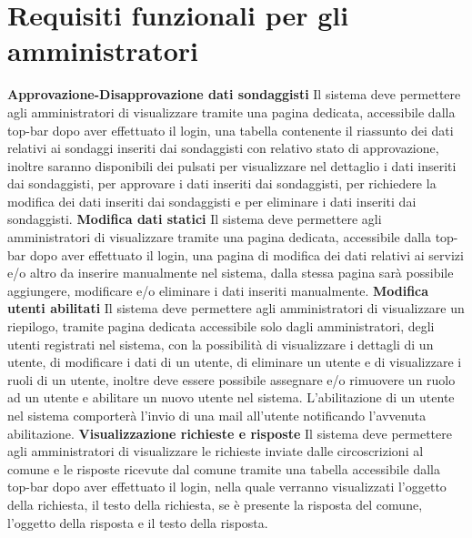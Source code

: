     \section{Requisiti funzionali per gli amministratori}
        \begin{rfList}
            \rfItem \textbf{Approvazione-Disapprovazione dati sondaggisti } Il sistema deve permettere agli amministratori di visualizzare tramite una pagina dedicata, accessibile dalla top-bar dopo aver effettuato il login, una tabella contenente il riassunto dei dati relativi ai sondaggi inseriti dai sondaggisti con relativo stato di approvazione, inoltre saranno disponibili dei pulsati per visualizzare nel dettaglio i dati inseriti dai sondaggisti, per approvare i dati inseriti dai sondaggisti, per richiedere la modifica dei dati inseriti dai sondaggisti e per eliminare i dati inseriti dai sondaggisti.
            \rfItem \textbf{Modifica dati statici} Il sistema deve permettere agli amministratori di visualizzare tramite una pagina dedicata, accessibile dalla top-bar dopo aver effettuato il login, una pagina di modifica dei dati relativi ai servizi e/o altro da inserire manualmente nel sistema, dalla stessa pagina sarà possibile aggiungere, modificare e/o eliminare i dati inseriti manualmente.
            \rfItem \textbf{Modifica utenti abilitati} Il sistema deve permettere agli amministratori di visualizzare un riepilogo, tramite pagina dedicata accessibile solo dagli amministratori, degli utenti registrati nel sistema, con la possibilità di visualizzare i dettagli di un utente, di modificare i dati di un utente, di eliminare un utente e di visualizzare i ruoli di un utente, inoltre deve essere possibile assegnare e/o rimuovere un ruolo ad un utente e abilitare un nuovo utente nel sistema. L'abilitazione di un utente nel sistema comporterà l'invio di una mail all'utente notificando l'avvenuta abilitazione.
            \rfItem \textbf{Visualizzazione richieste e risposte} Il sistema deve permettere agli amministratori di visualizzare le richieste inviate dalle circoscrizioni al comune e le risposte ricevute dal comune tramite una tabella accessibile dalla top-bar dopo aver effettuato il login, nella quale verranno visualizzati l'oggetto della richiesta, il testo della richiesta, se è presente la risposta del comune, l'oggetto della risposta e il testo della risposta.
        \end{rfList}\newpage
